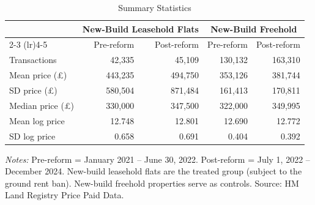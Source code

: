 \begin{table}[H]
\centering
\caption{Summary Statistics}
\label{tab:summary}
\begin{threeparttable}
\begin{tabular}{l rrrr}
\toprule
 & \multicolumn{2}{c}{New-Build Leasehold Flats} & \multicolumn{2}{c}{New-Build Freehold} \\
\cmidrule(lr){2-3} \cmidrule(lr){4-5}
 & Pre-reform & Post-reform & Pre-reform & Post-reform \\
\midrule
Transactions & 42,335 & 45,109 & 130,132 & 163,310 \\
Mean price (\pounds) & 443,235 & 494,750 & 353,126 & 381,744 \\
SD price (\pounds) & 580,504 & 871,484 & 161,413 & 170,811 \\
Median price (\pounds) & 330,000 & 347,500 & 322,000 & 349,995 \\
Mean log price & 12.748 & 12.801 & 12.690 & 12.772 \\
SD log price & 0.658 & 0.691 & 0.404 & 0.392 \\
\bottomrule
\end{tabular}
\begin{tablenotes}[flushleft]
\small
\item \textit{Notes:} Pre-reform = January 2021 -- June 30, 2022. Post-reform = July 1, 2022 -- December 2024. New-build leasehold flats are the treated group (subject to the ground rent ban). New-build freehold properties serve as controls. Source: HM Land Registry Price Paid Data.
\end{tablenotes}
\end{threeparttable}
\end{table}
